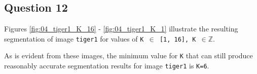 \subsection{Question 12}

Figures \ref{fig:04_tiger1_K_16} - \ref{fig:04_tiger1_K_1} illustrate the
resulting segmentation of image \texttt{tiger1} for values of
\texttt{K $\in$ [1, 16], K $\in \mathbb{Z}$}.

As is evident from these images, the minimum value for \texttt{K} that can still
produce reasonably accurate segmentation results for image \texttt{tiger1} is
\texttt{K=6}.


\noindent{}

